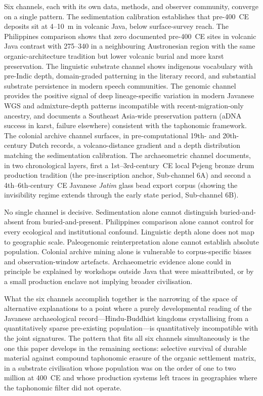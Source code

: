 \documentclass[12pt,a4paper]{article}
\begin{document}
Six channels, each with its own data, methods, and observer community, converge on a single pattern. The sedimentation calibration establishes that pre-400~CE deposits sit at 4--10~m in volcanic Java, below surface-survey reach. The Philippines comparison shows that zero documented pre-400~CE sites in volcanic Java contrast with 275--340 in a neighbouring Austronesian region with the same organic-architecture tradition but lower volcanic burial and more karst preservation. The linguistic substrate channel shows indigenous vocabulary with pre-Indic depth, domain-graded patterning in the literary record, and substantial substrate persistence in modern speech communities. The genomic channel provides the positive signal of deep lineage-specific variation in modern Javanese WGS and admixture-depth patterns incompatible with recent-migration-only ancestry, and documents a Southeast Asia-wide preservation pattern (aDNA success in karst, failure elsewhere) consistent with the taphonomic framework. The colonial archive channel surfaces, in pre-computational 19th- and 20th-century Dutch records, a volcano-distance gradient and a depth distribution matching the sedimentation calibration. The archaeometric channel documents, in two chronological layers, first a 1st--3rd-century~CE local Pejeng bronze drum production tradition (the pre-inscription anchor, Sub-channel 6A) and second a 4th--6th-century~CE Javanese \textit{Jatim} glass bead export corpus (showing the invisibility regime extends through the early state period, Sub-channel 6B).

No single channel is decisive. Sedimentation alone cannot distinguish buried-and-absent from buried-and-present. Philippines comparison alone cannot control for every ecological and institutional confound. Linguistic depth alone does not map to geographic scale. Paleogenomic reinterpretation alone cannot establish absolute population. Colonial archive mining alone is vulnerable to corpus-specific biases and observation-window artefacts. Archaeometric evidence alone could in principle be explained by workshops outside Java that were misattributed, or by a small production enclave not implying broader civilisation.

What the six channels accomplish together is the narrowing of the space of alternative explanations to a point where a purely developmental reading of the Javanese archaeological record---Hindu-Buddhist kingdoms crystallising from a quantitatively sparse pre-existing population---is quantitatively incompatible with the joint signatures. The pattern that fits all six channels simultaneously is the one this paper develops in the remaining sections: selective survival of durable material against compound taphonomic erasure of the organic settlement matrix, in a substrate civilisation whose population was on the order of one to two million at 400~CE and whose production systems left traces in geographies where the taphonomic filter did not operate.
\end{document}
